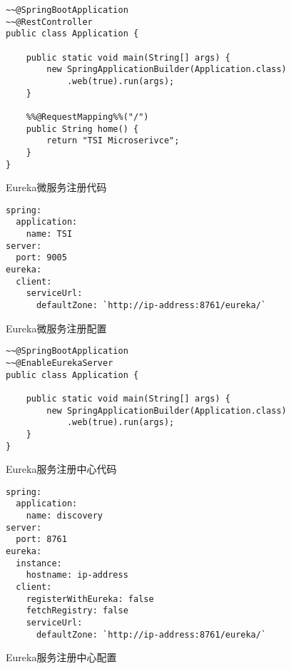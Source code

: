 \begin{figure}[htb!]
\centering
\begin{minipage}[t]{1.0\linewidth}
\begin{lstlisting}
~~@SpringBootApplication
~~@RestController
public class Application {

    public static void main(String[] args) {
        new SpringApplicationBuilder(Application.class)
        	.web(true).run(args);
    }

    %%@RequestMapping%%("/")
    public String home() {
        return "TSI Microserivce";
    }
}
\end{lstlisting}
\end{minipage} 
\caption{Eureka微服务注册代码}
\label{fig:Eureka微服务注册代码}
\end{figure}

\begin{figure}[htb!]
\centering
\begin{minipage}[t]{1.0\linewidth}
\begin{lstlisting}
spring:
  application:
    name: TSI
server:
  port: 9005
eureka:
  client:
    serviceUrl:
      defaultZone: `http://ip-address:8761/eureka/`
\end{lstlisting}
\end{minipage} 
\caption{Eureka微服务注册配置}
\label{fig:Eureka微服务注册配置}
\end{figure}

\begin{figure}[htb!]
\centering
\begin{minipage}[t]{1.0\linewidth}
\begin{lstlisting}
~~@SpringBootApplication
~~@EnableEurekaServer
public class Application {

    public static void main(String[] args) {
        new SpringApplicationBuilder(Application.class)
        	.web(true).run(args);
    }
}
\end{lstlisting}
\end{minipage} 
\caption{Eureka服务注册中心代码}
\label{fig:Eureka服务注册中心代码}
\end{figure}

\begin{figure}[htb!]
\centering
\begin{minipage}[t]{1.0\linewidth}
\begin{lstlisting}
spring:
  application:
    name: discovery
server:
  port: 8761
eureka:
  instance:
    hostname: ip-address
  client:
    registerWithEureka: false
    fetchRegistry: false
    serviceUrl:
      defaultZone: `http://ip-address:8761/eureka/`
\end{lstlisting}
\end{minipage} 
\caption{Eureka服务注册中心配置}
\label{fig:Eureka服务注册中心配置}
\end{figure}

